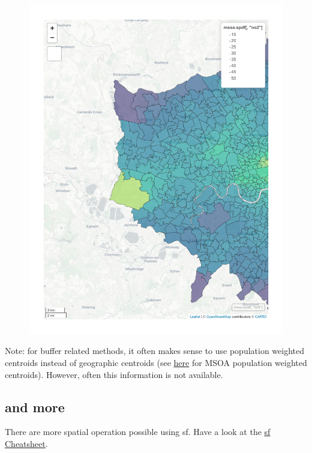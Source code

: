 \documentclass[
  letterpaper,
  DIV=11,
  numbers=noendperiod]{scrreprt}
\begin{document}
\begin{figure}[H]

{\centering \includegraphics{02_spatial-data_files/figure-pdf/unnamed-chunk-13-1.pdf}

}

\end{figure}

Note: for buffer related methods, it often makes sense to use population
weighted centroids instead of geographic centroids (see
\href{https://geoportal.statistics.gov.uk/datasets/ons::middle-layer-super-output-areas-december-2011-population-weighted-centroids/about}{here}
for MSOA population weighted centroids). However, often this information
is not available.

\hypertarget{and-more}{%
\subsection{and more}\label{and-more}}

There are more spatial operation possible using sf. Have a look at the
\href{fig/sf.pdf}{sf Cheatsheet}.
\end{document}
